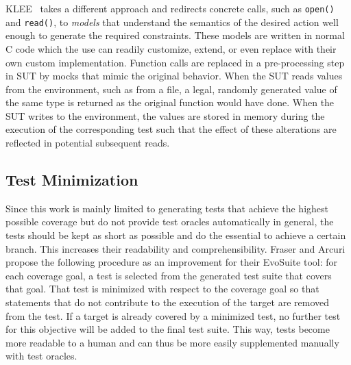 \documentclass{article}
\begin{document}
KLEE~\cite{cadar2008klee} takes a different approach and redirects concrete calls, such as \lstinline{open()} and \lstinline{read()}, to \textit{models} that understand the semantics of the desired action well enough to generate the required constraints. These models are written in normal C code which the use can readily customize, extend, or even replace with their own custom implementation. Function calls are replaced in a pre-processing step in \ac{SUT} by mocks that mimic the original behavior. When the \ac{SUT} reads values from the environment, such as from a file, a legal, randomly generated value of the same type is returned as the original function would have done. When the \ac{SUT} writes to the environment, the values are stored in memory during the execution of the corresponding test such that the effect of these alterations are reflected in potential subsequent reads. 

\subsection{Test Minimization}

Since this work is mainly limited to generating tests that achieve the highest possible coverage but do not provide test oracles automatically in general, the tests should be kept as short as possible and do the essential to achieve a certain branch. This increases their readability and comprehensibility. Fraser and Arcuri~\cite{Fraser2013a} propose the following procedure as an improvement for their EvoSuite tool: for each coverage goal, a test is selected from the generated test suite that covers that goal. That test is minimized with respect to the coverage goal so that statements that do not contribute to the execution of the target are removed from the test. If a target is already covered by a minimized test, no further test for this objective will be added to the final test suite. This way, tests become more readable to a human and can thus be more easily supplemented manually with test oracles. 
\end{document}
